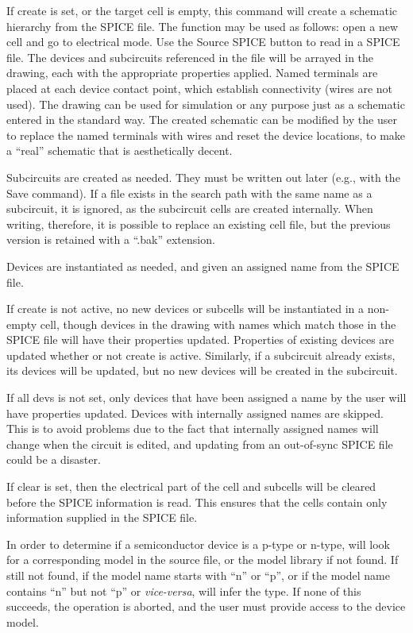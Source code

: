 If {\cb create} is set, or the target cell is empty, this command will
create a schematic hierarchy from the SPICE file.  The function may be
used as follows:  open a new cell and go to electrical mode.  Use the
{\cb Source SPICE} button to read in a SPICE file.  The devices and
subcircuits referenced in the file will be arrayed in the drawing,
each with the appropriate properties applied.  Named terminals are
placed at each device contact point, which establish connectivity
(wires are not used).  The drawing can be used for simulation or any
purpose just as a schematic entered in the standard way.  The created
schematic can be modified by the user to replace the named terminals
with wires and reset the device locations, to make a ``real''
schematic that is aesthetically decent.

Subcircuits are created as needed.  They must be written out later
(e.g., with the {\cb Save} command).  If a file exists in the search
path with the same name as a subcircuit, it is ignored, as the
subcircuit cells are created internally.  When writing, therefore, it
is possible to replace an existing cell file, but the previous version
is retained with a ``{\vt .bak}'' extension.

Devices are instantiated as needed, and given an assigned name from
the SPICE file.

If {\cb create} is not active, no new devices or subcells will be
instantiated in a non-empty cell, though devices in the drawing with
names which match those in the SPICE file will have their properties
updated.  Properties of existing devices are updated whether or not
{\cb create} is active.  Similarly, if a subcircuit already exists,
its devices will be updated, but no new devices will be created in the
subcircuit.

If {\cb all devs} is not set, only devices that have been assigned a
name by the user will have properties updated.  Devices with
internally assigned names are skipped.  This is to avoid problems due
to the fact that internally assigned names will change when the
circuit is edited, and updating from an out-of-sync SPICE file could
be a disaster.

If {\cb clear} is set, then the electrical part of the cell and
subcells will be cleared before the SPICE information is read.  This
ensures that the cells contain only information supplied in the SPICE
file.

In order to determine if a semiconductor device is a p-type or n-type,
{\Xic} will look for a corresponding model in the source file, or the
model library if not found.  If still not found, if the model name
starts with ``n'' or ``p'', or if the model name contains ``n'' but
not ``p'' or {\it vice-versa\/}, {\Xic} will infer the type.  If none
of this succeeds, the operation is aborted, and the user must provide
access to the device model.

